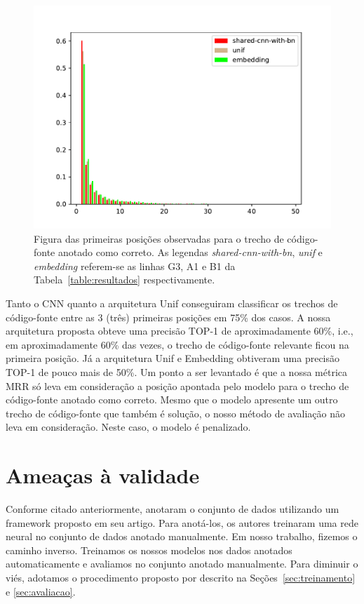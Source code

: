 \begin{figure}[h]
    \centering
    \includegraphics[width=1\textwidth]{figuras/cap-resultados/histogram.pdf}
    \caption{Figura das primeiras posições observadas para o trecho de código-fonte anotado como correto. As legendas \emph{shared-cnn-with-bn}, \emph{unif} e \emph{embedding} referem-se as linhas G3, A1 e B1 da Tabela~\ref{table:resultados} respectivamente.}
    \label{fig:histogram-mrr}
\end{figure}


Tanto o CNN quanto a arquitetura Unif conseguiram classificar os trechos de código-fonte entre as 3 (três) primeiras posições em 75\% dos casos. A nossa arquitetura proposta obteve uma precisão TOP-1 de aproximadamente 60\%, i.e., em aproximadamente 60\% das vezes, o trecho de código-fonte relevante ficou na primeira posição. Já a arquitetura Unif e Embedding obtiveram uma precisão TOP-1 de pouco mais de 50\%. Um ponto a ser levantado é que a nossa métrica MRR só leva em consideração a posição apontada pelo modelo para o trecho de código-fonte anotado como correto. Mesmo que o modelo apresente um outro trecho de código-fonte que também é solução, o nosso método de avaliação não leva em consideração. Neste caso, o modelo é penalizado.



\section{Ameaças à validade}

Conforme citado anteriormente, \cite{yao-2018} anotaram o conjunto de dados utilizando um framework proposto em seu artigo. Para anotá-los, os autores treinaram uma rede neural no conjunto de dados anotado manualmente. Em nosso trabalho, fizemos o caminho inverso. Treinamos os nossos modelos nos dados anotados automaticamente e avaliamos no conjunto anotado manualmente. Para diminuir o viés, adotamos o procedimento proposto por \cite{iyer-etal-2016-summarizing} descrito na Seções~\ref{sec:treinamento} e \ref{sec:avaliacao}.

